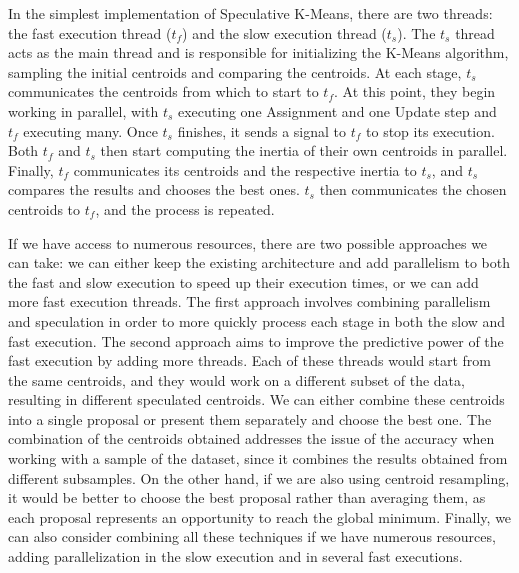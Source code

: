 In the simplest implementation of Speculative K-Means, there are two threads: the fast execution thread ($t_f$) and the slow execution thread ($t_s$). The $t_s$ thread acts as the main thread and is responsible for initializing the K-Means algorithm, sampling the initial centroids and comparing the centroids.
At each stage, $t_s$ communicates the centroids from which to start to $t_f$. At this point, they begin working in parallel, with $t_s$ executing one Assignment and one Update step and $t_f$ executing many. Once $t_s$ finishes, it sends a signal to $t_f$ to stop its execution. Both $t_f$ and $t_s$ then start computing the inertia of their own centroids in parallel. Finally, $t_f$ communicates its centroids and the respective inertia to $t_s$, and $t_s$ compares the results and chooses the best ones. $t_s$ then communicates the chosen centroids to $t_f$, and the process is repeated.

If we have access to numerous resources, there are two possible approaches we can take: we can either keep the existing architecture and add parallelism to both the fast and slow execution to speed up their execution times, or we can add more fast execution threads. The first approach involves combining parallelism and speculation in order to more quickly process each stage in both the slow and fast execution. The second approach aims to improve the predictive power of the fast execution by adding more threads. Each of these threads would start from the same centroids, and they would work on a different subset of the data, resulting in different speculated centroids. We can either combine these centroids into a single proposal or present them separately and choose the best one. The combination of the centroids obtained addresses the issue of the accuracy when working with a sample of the dataset, since it combines the results obtained from different subsamples. On the other hand, if we are also using centroid resampling, it would be better to choose the best proposal rather than averaging them, as each proposal represents an opportunity to reach the global minimum. Finally, we can also consider combining all these techniques if we have numerous resources, adding parallelization in the slow execution and in several fast executions.